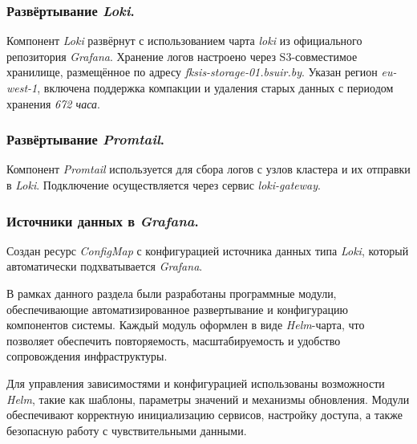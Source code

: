 \subsubsection{Развёртывание \textit{Loki}.} Компонент \textit{Loki} развёрнут с использованием чарта \textit{loki} из официального репозитория \textit{Grafana}. Хранение логов настроено через S3-совместимое хранилище, размещённое по адресу \textit{fksis-storage-01.bsuir.by}. Указан регион \textit{eu-west-1}, включена поддержка компакции и удаления старых данных с периодом хранения \textit{672 часа}.

\subsubsection{Развёртывание \textit{Promtail}.} Компонент \textit{Promtail} используется для сбора логов с узлов кластера и их отправки в \textit{Loki}. Подключение осуществляется через сервис \textit{loki-gateway}.

\subsubsection{Источники данных в \textit{Grafana}.} Создан ресурс \textit{ConfigMap} с конфигурацией источника данных типа \textit{Loki}, который автоматически подхватывается \textit{Grafana}.

В рамках данного раздела были разработаны программные модули, обеспечивающие автоматизированное развертывание и конфигурацию компонентов системы. Каждый модуль оформлен в виде \textit{Helm}-чарта, что позволяет обеспечить повторяемость, масштабируемость и удобство сопровождения инфраструктуры.

Для управления зависимостями и конфигурацией использованы возможности \textit{Helm}, такие как шаблоны, параметры значений и механизмы обновления. Модули обеспечивают корректную инициализацию сервисов, настройку доступа, а также безопасную работу с чувствительными данными.
